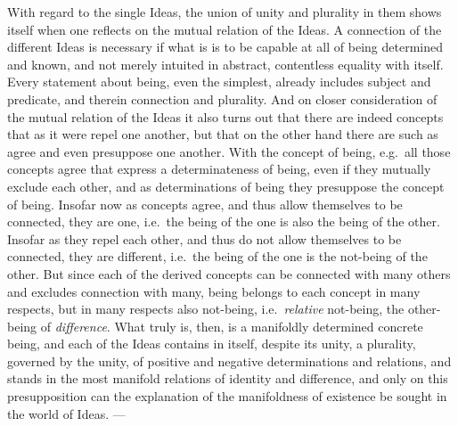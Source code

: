 With regard to the single Ideas, the union of
unity and plurality in them shows itself when one reflects on the mutual
relation of the Ideas. A connection of the different Ideas is
necessary if what is is to be capable at all of being determined and known, and not merely intuited in abstract, contentless
equality with itself. Every statement about being, even the
simplest, already includes subject and predicate, and therein
connection and plurality. And on closer consideration of
the mutual relation of the Ideas it also turns out that there are indeed
concepts that as it were repel one another, but that
on the other hand there are such as agree and even presuppose one another. With the concept of being, e.g.\ all those concepts agree that express a determinateness of being, even if they
mutually exclude each other, and as determinations of being
they presuppose the concept of being. Insofar now as concepts agree,
and thus allow themselves to be connected, they are one, i.e.\ the being of the one is
also the being of the other. Insofar as they repel each other, and
thus do not allow themselves to be connected, they are different, i.e.\ the being of the one
is the not-being of the other. But since each of the derived concepts can be connected with many others and excludes connection with many, being belongs to each
concept in many respects, but in many respects
also not-being, i.e.\ \emph{relative} not-being, the other-being of \emph{difference}. What truly is, then, is a
manifoldly determined concrete being, and each of the Ideas contains in itself, despite its unity, a plurality, governed by the unity, of positive and negative determinations and relations, and
stands in the most manifold relations of identity and difference, and
only on this presupposition can the explanation of the
manifoldness of existence be sought in the world of Ideas. ---


